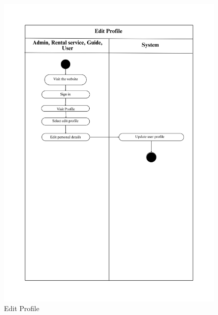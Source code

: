 \begin{figure}[h!]
    \centering
    \includegraphics[width=1\linewidth]{Images/Activity Diagrams/5 Edit Profile.png}
    \caption{Edit Profile}
    \label{fig:activity-edit-profile}
\end{figure}

